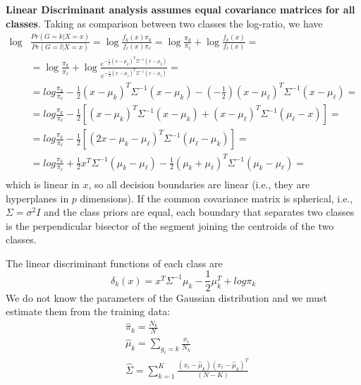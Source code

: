 \textbf{Linear Discriminant analysis assumes equal covariance matrices for all classes}. Taking as comparison between two classes the log-ratio, we have
\begin{equation}
\begin{aligned}
\log &\frac{Pr(G=k|X=x)}{Pr(G=l|X=x)} = \log \frac{f_k(x) \pi_k}{f_\ell(x) \pi_\ell} = \log \frac{ \pi_k}{ \pi_\ell} + \log\frac{f_k(x)}{f_\ell(x) } =\\
&= \log \frac{ \pi_k}{ \pi_\ell} + \log\frac{e^{-\frac{1}{2}\left( x-\mu_k\right)^T\Sigma^{-1}\left( x-\mu_k\right)}}{e^{-\frac{1}{2}\left( x-\mu_\ell\right)^T\Sigma^{-1}\left( x-\mu_\ell\right)} }   =  \\
&=log \frac{ \pi_k}{ \pi_\ell} - \frac{1}{2}\left( x-\mu_k\right)^T\Sigma^{-1}\left( x-\mu_k\right) - \left( -\frac{1}{2}\right)\left( x-\mu_\ell\right)^T\Sigma^{-1}\left( x-\mu_\ell\right) =\\
&= log \frac{ \pi_k}{ \pi_\ell} - \frac{1}{2}\left[\left( x-\mu_k\right)^T\Sigma^{-1}\left( x-\mu_k\right) + \left( x-\mu_\ell\right)^T\Sigma^{-1}\left( \mu_\ell - x\right)\right] =\\
&= log \frac{ \pi_k}{ \pi_\ell} - \frac{1}{2}\left[\left( 2x-\mu_k-\mu_\ell\right)^T\Sigma^{-1}\left( \mu_\ell-\mu_k\right) \right] =\\
&= log \frac{ \pi_k}{ \pi_\ell} +\frac{1}{2}x^T\Sigma^{-1}\left( \mu_k-\mu_\ell\right)- \frac{1}{2}\left( \mu_k+\mu_\ell\right)^T\Sigma^{-1}\left( \mu_k-\mu_\ell\right) =\\
\end{aligned}
\end{equation}
which is linear in $x$, so all decision boundaries are linear (i.e., they are hyperplanes in $p$ dimensions). If the common covariance matrix is spherical, i.e., $\Sigma=\sigma^2 I$ and the class priors are equal, each boundary that separates two classes is the perpendicular bisector of the segment joining the centroids of the two classes.

The linear discriminant functions of each class are 
\begin{equation}
\delta_k(x)  = x^T \Sigma^{-1}\mu_k -\frac{1}{2}\mu_k^T+log\pi_k
\end{equation}
We do not know the parameters of the Gaussian distribution and we must estimate them from the training data:
\begin{align}
&\hat{\pi}_k = \frac{N_k}{N}\\
&\hat{\mu}_k = \sum_{g_i=k}\frac{x_i}{N_k}\\
&\hat{\Sigma} = \sum_{k=1}^K\frac{(x_i-\hat{\mu}_k)(x_i-\hat{\mu}_k)^T}{(N-K)}
\end{align}

